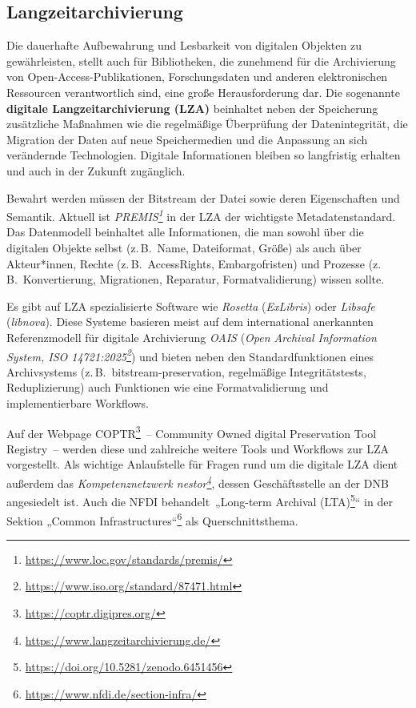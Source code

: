 \documentclass[
  11pt,
  letterpaper,
  DIV=11,
  twoside]{scrreprt}
\DeclareRobustCommand{\href}[2]{#2\footnote{\url{#1}}}
\begin{document}
\subsection{Langzeitarchivierung}\label{langzeitarchivierung}

Die dauerhafte Aufbewahrung und Lesbarkeit von digitalen Objekten zu
gewährleisten, stellt auch für Bibliotheken, die zunehmend für die
Archivierung von Open-Access-Publikationen, Forschungsdaten und anderen
elektronischen Ressourcen verantwortlich sind, eine große
Herausforderung dar. Die sogenannte \textbf{digitale
Langzeitarchivierung ({LZA})} beinhaltet neben der Speicherung
zusätzliche Maßnahmen wie die regelmäßige Überprüfung der
Datenintegrität, die Migration der Daten auf neue Speichermedien und die
Anpassung an sich verändernde Technologien. Digitale Informationen
bleiben so langfristig erhalten und auch in der Zukunft zugänglich.

Bewahrt werden müssen der Bitstream der Datei sowie deren Eigenschaften
und Semantik. Aktuell ist
\emph{\href{https://www.loc.gov/standards/premis/}{PREMIS}} in der {LZA}
der wichtigste Metadatenstandard. Das Datenmodell beinhaltet alle
Informationen, die man sowohl über die digitalen Objekte selbst
(z.\,B.~Name, Dateiformat, Größe) als auch über Akteur*innen, Rechte
(z.\,B.~AccessRights, Embargofristen) und Prozesse
(z.\,B.~Konvertierung, Migrationen, Reparatur, Formatvalidierung) wissen
sollte.~

Es gibt auf {LZA} spezialisierte Software wie \emph{Rosetta}
(\emph{ExLibris}) oder \emph{Libsafe} (\emph{libnova}). Diese Systeme
basieren meist auf dem international anerkannten Referenzmodell für
digitale Archivierung \emph{OAIS}
(\emph{\href{https://www.iso.org/standard/87471.html}{Open Archival
Information System, ISO 14721:2025}}) und bieten neben den
Standardfunktionen eines Archivsystems (z.\,B.~bitstream-preservation,
regelmäßige Integritätstests, Reduplizierung) auch Funktionen wie eine
Formatvalidierung und implementierbare Workflows.

Auf der Webpage \href{https://coptr.digipres.org/}{COPTR}~-- Community
Owned digital Preservation Tool Registry~-- werden diese und zahlreiche
weitere Tools und Workflows zur {LZA} vorgestellt. Als wichtige
Anlaufstelle für Fragen rund um die digitale {LZA} dient außerdem das
\emph{\href{https://www.langzeitarchivierung.de/}{Kompetenznetzwerk
nestor}}, dessen Geschäftsstelle an der DNB angesiedelt ist. Auch die
{NFDI}
behandelt~„\href{https://doi.org/10.5281/zenodo.6451456}{Long-term
Archival (LTA)}`` in der
\href{https://www.nfdi.de/section-infra/}{Sektion „Common
Infrastructures``} als Querschnittsthema.
\end{document}
